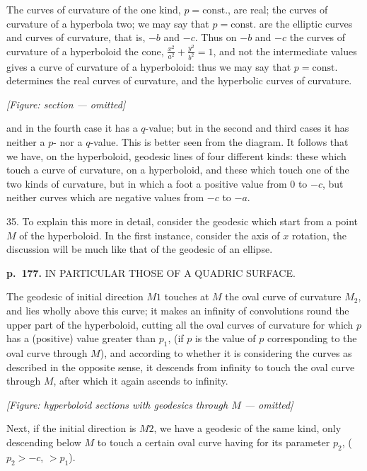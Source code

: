 \documentclass[11pt,a4paper]{article}
\begin{document}
The curves of curvature of the one kind, $p = \mathrm{const.}$, are real; the curves of curvature of a hyperbola two; we may say that $p = \mathrm{const.}$ are the elliptic curves and curves of curvature, that is, $-b$ and $-c$. Thus on $-b$ and $-c$ the curves of curvature of a hyperboloid the cone, $\frac{x^2}{a^2} + \frac{y^2}{b^2} = 1$, and not the intermediate values gives a curve of curvature of a hyperboloid: thus we may say that $p = \mathrm{const.}$ determines the real curves of curvature, and the hyperbolic curves of curvature.

\begin{center}
\textit{[Figure: section --- omitted]}
\end{center}

and in the fourth case it has a $q$-value; but in the second and third cases it has neither a $p$- nor a $q$-value.  This is better seen from the diagram.  It follows that we have, on the hyperboloid, geodesic lines of four different kinds: these which touch a curve of curvature, on a hyperboloid, and these which touch one of the two kinds of curvature, but in which a foot a positive value from $0$ to $-c$, but neither curves which are negative values from $-c$ to $-a$.

35. To explain this more in detail, consider the geodesic which start from a point $M$ of the hyperboloid.  In the first instance, consider the axis of $x$ rotation, the discussion will be much like that of the geodesic of an ellipse.

\clearpage

\noindent
\textbf{p.~177.}  IN PARTICULAR THOSE OF A QUADRIC SURFACE.

The geodesic of initial direction $M1$ touches at $M$ the oval curve of curvature $M_2$, and lies wholly above this curve; it makes an infinity of convolutions round the upper part of the hyperboloid, cutting all the oval curves of curvature for which $p$ has a (positive) value greater than $p_1$, (if $p$ is the value of $p$ corresponding to the oval curve through $M$), and according to whether it is considering the curves as described in the opposite sense, it descends from infinity to touch the oval curve through $M$, after which it again ascends to infinity.

\begin{center}
\textit{[Figure: hyperboloid sections with geodesics through $M$ --- omitted]}
\end{center}

Next, if the initial direction is $M2$, we have a geodesic of the same kind, only descending below $M$ to touch a certain oval curve having for its parameter $p_2$, ($p_2 > -c$, $> p_1$).
\end{document}
